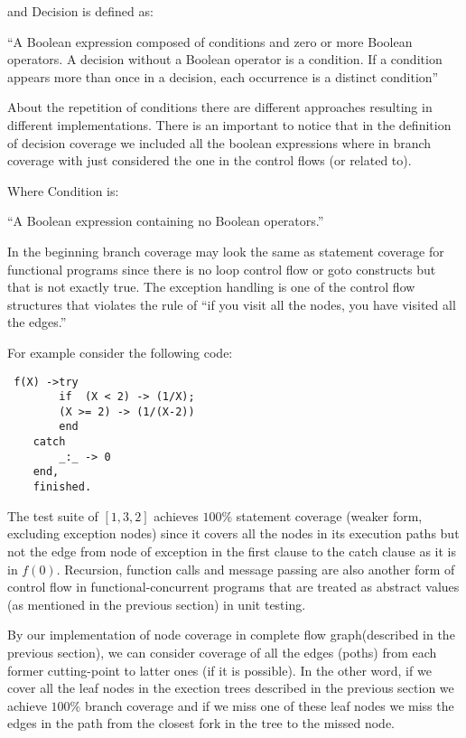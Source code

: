 \documentclass[12pt,a4paper]{report}
\begin{document}
and Decision is defined as:

“A Boolean expression composed of conditions and zero or more Boolean operators. A decision without a Boolean operator is a condition. If a condition
 appears more than once in a decision, each occurrence is a distinct condition”\cite{cast-10}

About the repetition of conditions there are different approaches resulting in different implementations. There is an important to notice that in the
 definition of decision coverage we included all the boolean expressions where in branch coverage with just considered the one in the control flows 
(or related to).

Where Condition is:

“A Boolean expression containing no Boolean operators.”\cite{cast-10}

In the beginning branch coverage may look the same as statement coverage for functional programs since there is no loop control flow or goto constructs but
 that is not exactly true. The exception handling is one of the control flow structures that violates the rule of “if you visit all the nodes, you have
 visited all the edges.”

For example consider the following code:
 
\begin{lstlisting}
 f(X) ->try
	    if  (X < 2) -> (1/X);
		(X >= 2) -> (1/(X-2)) 
	    end
	catch  
	    _:_ -> 0
	end,
	finished. 
\end{lstlisting}

The test suite of $[1,3,2]$ achieves $100\%$ statement coverage (weaker form, excluding exception nodes) since it covers all the nodes in its execution
 paths but not the edge from node of exception in the first clause to the catch clause as it is in $f(0)$. Recursion, function calls and message passing
 are also another form of control flow in functional-concurrent programs that are treated as abstract values (as mentioned in the previous section) in
 unit testing.

By our implementation of node coverage in complete flow graph(described in the previous section), we can consider coverage of all the edges (poths) from
 each former cutting-point to latter ones (if it is possible). In the other word, if we cover all the leaf nodes in the exection trees described in the
 previous section we achieve $100\%$ branch coverage and if we miss one of these leaf nodes we miss the edges in the path from the closest fork in the
 tree to the missed node.
\end{document}
